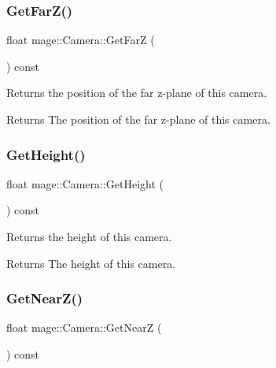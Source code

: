 \hypertarget{classmage_1_1_camera_a7f293a8711086b3419fe3b4224ff2778}{}\label{classmage_1_1_camera_a7f293a8711086b3419fe3b4224ff2778} 
\subsubsection{\texorpdfstring{Get\+Far\+Z()}{GetFarZ()}}
{\footnotesize\ttfamily float mage\+::\+Camera\+::\+Get\+FarZ (\begin{DoxyParamCaption}{ }\end{DoxyParamCaption}) const}

Returns the position of the far z-\/plane of this camera.

\begin{DoxyReturn}{Returns}
The position of the far z-\/plane of this camera. 
\end{DoxyReturn}
\hypertarget{classmage_1_1_camera_a4c6c5e96085651ce29cd6e87543d21ec}{}\label{classmage_1_1_camera_a4c6c5e96085651ce29cd6e87543d21ec} 
\subsubsection{\texorpdfstring{Get\+Height()}{GetHeight()}}
{\footnotesize\ttfamily float mage\+::\+Camera\+::\+Get\+Height (\begin{DoxyParamCaption}{ }\end{DoxyParamCaption}) const}

Returns the height of this camera.

\begin{DoxyReturn}{Returns}
The height of this camera. 
\end{DoxyReturn}
\hypertarget{classmage_1_1_camera_a175e3c36526a8a3e28cd2f8bd1701c55}{}\label{classmage_1_1_camera_a175e3c36526a8a3e28cd2f8bd1701c55} 
\subsubsection{\texorpdfstring{Get\+Near\+Z()}{GetNearZ()}}
{\footnotesize\ttfamily float mage\+::\+Camera\+::\+Get\+NearZ (\begin{DoxyParamCaption}{ }\end{DoxyParamCaption}) const}

